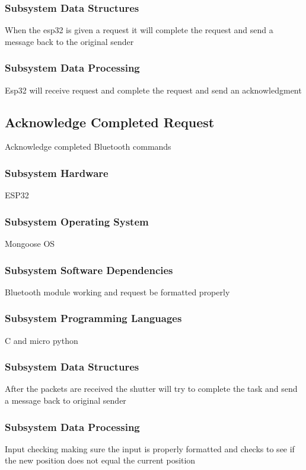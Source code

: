 \subsubsection{Subsystem Data Structures}
When the esp32 is given a request it will complete the request and send a message back to the original sender

\subsubsection{Subsystem Data Processing}
Esp32 will receive request and complete the request and send an acknowledgment 

\subsection{Acknowledge Completed Request}
Acknowledge completed Bluetooth commands

\subsubsection{Subsystem Hardware}
ESP32

\subsubsection{Subsystem Operating System}
Mongoose OS

\subsubsection{Subsystem Software Dependencies}
Bluetooth module working and request be formatted properly


\subsubsection{Subsystem Programming Languages}
C and micro python

\subsubsection{Subsystem Data Structures}
After the packets are received the shutter will try to complete the task and send a message back to original sender 

\subsubsection{Subsystem Data Processing}
Input checking making sure the input is properly formatted and checks to see if the new position does not equal the current position





